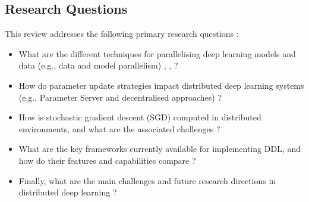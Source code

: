 \subsection{Research Questions}
\label{sec:research_questions}
This review addresses the following primary research questions :

\begin{itemize}
  \item What are the different techniques for parallelising deep learning models and data (e.g., data and model parallelism) \cite{berloco_systematic_2022}, \cite{ben-nun_demystifying_2020}, \cite{langer_distributed_2020}?
  \item How do parameter update strategies impact distributed deep learning systems (e.g., Parameter Server and decentralised approaches) \cite{ben-nun_demystifying_2020,berloco_systematic_2022,langer_distributed_2020}?
  \item How is stochastic gradient descent (SGD) computed in distributed environments, and what are the associated challenges \cite{berloco_systematic_2022,ben-nun_demystifying_2020,langer_distributed_2020,verbraeken_survey_2021}?
  \item What are the key frameworks currently available for implementing DDL, and how do their features and capabilities compare \cite{berloco_systematic_2022}?
  \item Finally, what are the main challenges and future research directions in distributed deep learning \cite{dehghani_distributed_2023,ben-nun_demystifying_2020,berloco_systematic_2022,langer_distributed_2020}?
\end{itemize}



